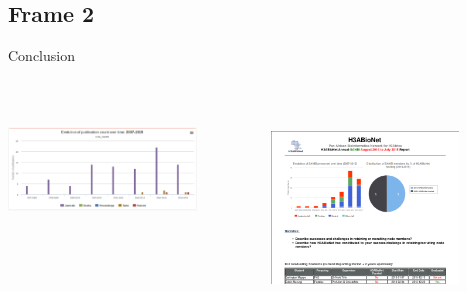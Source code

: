 \documentclass[xcolor=x11names,compress]{beamer}
\renewcommand{\(}{\begin{columns}}
\renewcommand{\)}{\end{columns}}
\newcommand{\<}[1]{\begin{column}{#1}}
\renewcommand{\>}{\end{column}}
\begin{document}
\subsection{Frame 2}
\begin{frame}{Conclusion}
\begin{columns}[T]
 \begin{column}{.5\textwidth}
  \begin{block}{}
    \includegraphics[width=5cm, height=4cm]{images/graphic.png}
  \end{block}
 \end{column}
 \begin{column}{.5\textwidth}
  \begin{block}{}
   \includegraphics[width=5cm, height=6cm]{images/report.png}
  \end{block}
 \end{column}
\end{columns}
\end{frame}
\end{document}
